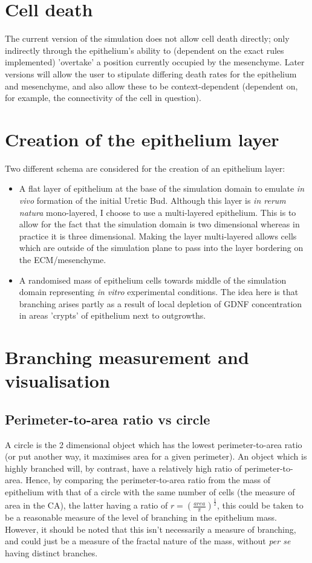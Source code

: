 \documentclass[pdftex,10pt,a4paper]{article}
\begin{document}
\section{Cell death}
The current version of the simulation does not allow cell death directly; only indirectly through the epithelium's ability to (dependent on the exact rules implemented) 'overtake' a position currently occupied by the mesenchyme. Later versions will allow the user to stipulate differing death rates for the epithelium and mesenchyme, and also allow these to be context-dependent (dependent on, for example, the connectivity of the cell in question).

\section{Creation of the epithelium layer}
Two different schema are considered for the creation of an epithelium layer:
\begin{itemize}
\item A flat layer of epithelium at the base of the simulation domain to emulate \textit{in vivo} formation of the initial Uretic Bud. Although this layer is \textit{in rerum natura} mono-layered, I choose to use a multi-layered epithelium. This is to allow for the fact that the simulation domain is two dimensional whereas in practice it is three dimensional. Making the layer multi-layered allows cells which are outside of the simulation plane to pass into the layer bordering on the ECM/mesenchyme.
\item A randomised mass of epithelium cells towards middle of the simulation domain representing \textit{in vitro} experimental conditions. The idea here is that branching arises partly as a result of local depletion of GDNF concentration in areas 'crypts' of epithelium next to outgrowths.
\end{itemize}

\section{Branching measurement and visualisation}
\subsection{Perimeter-to-area ratio vs circle}
A circle is the 2 dimensional object which has the lowest perimeter-to-area ratio (or put another way, it maximises area for a given perimeter). An object which is highly branched will, by contrast, have a relatively high ratio of perimeter-to-area. Hence, by comparing the perimeter-to-area ratio from the mass of epithelium with that of a circle with the same number of cells (the measure of area in the CA), the latter having a ratio of $r = (\frac{area}{\pi})^\frac{1}{2}$, this could be taken to be a reasonable measure of the level of branching in the epithelium mass. However, it should be noted that this isn't necessarily a measure of branching, and could just be a measure of the fractal nature of the mass, without \emph{per se} having distinct branches.
\end{document}
